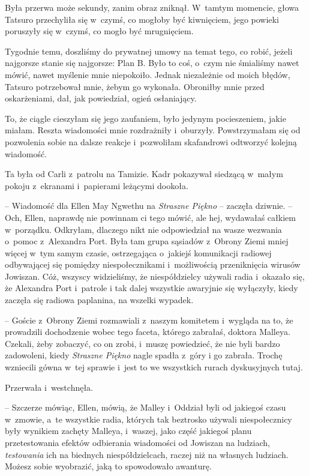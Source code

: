 \documentclass[oneside,polish,11pt,sfheadings]{mwbk}
\begin{document}
Była przerwa może sekundy, zanim obraz zniknął. W~tamtym momencie, głowa
Tatsuro przechyliła się w~czymś, co mogłoby być kiwnięciem, jego powieki
poruszyły się w~czymś, co mogło być mrugnięciem.

Tygodnie temu, doszliśmy do prywatnej umowy na temat tego, co robić,
jeżeli najgorsze stanie się najgorsze: Plan B. Było to coś, o~czym nie
śmialiśmy nawet mówić, nawet myślenie mnie niepokoiło. Jednak
niezależnie od moich błędów, Tatsuro potrzebował mnie, żebym go
wykonała. Obroniłby mnie przed oskarżeniami, dał, jak powiedział, ogień
osłaniający.

To, że ciągle cieszyłam się jego zaufaniem, było jedynym pocieszeniem,
jakie miałam. Reszta wiadomości mnie rozdrażniły i~oburzyły.
Powstrzymałam się od pozwolenia sobie na dalsze reakcje i~pozwoliłam
skafandrowi odtworzyć kolejną wiadomość.

Ta była od Carli z~patrolu na Tamizie. Kadr pokazywał siedzącą w~małym
pokoju z~ekranami i~papierami leżącymi dookoła.

-- Wiadomość dla Ellen May Ngwethu na \textit{Straszne Piękno} -- zaczęła
dziwnie. -- Och, Ellen, naprawdę nie powinnam ci tego mówić, ale hej,
wydawałaś całkiem w~porządku. Odkryłam, dlaczego nikt nie odpowiedział
na wasze wezwania o~pomoc z~Alexandra Port. Była tam grupa sąsiadów z~Obrony Ziemi mniej więcej w~tym samym czasie, ostrzegająca o~jakiejś
komunikacji radiowej odbywającej się pomiędzy niespołecznikami i~możliwością przeniknięcia wirusów Jowiszan. Cóż, wszyscy widzieliśmy, że
niespółdzielcy używali radia i~okazało się, że Alexandra Port i~patrole
i tak dalej wszystkie awaryjnie się wyłączyły, kiedy zaczęła się radiowa
paplanina, na wszelki wypadek.

-- Goście z~Obrony Ziemi rozmawiali z~naszym komitetem i~wygląda na to,
że prowadzili dochodzenie wobec tego faceta, którego zabrałaś, doktora
Malleya. Czekali, żeby zobaczyć, co on zrobi, i~muszę powiedzieć, że nie
byli bardzo zadowoleni, kiedy \textit{Straszne Piękno} nagle spadła z~góry
i go zabrała. Trochę wzniecili gówna w~tej sprawie i~jest to we
wszystkich rurach dyskusyjnych tutaj.

Przerwała i~westchnęła. 

-- Szczerze mówiąc, Ellen, mówią, że Malley i~Oddział byli od jakiegoś czasu w~zmowie, a~te wszystkie radia, których
tak beztrosko używali niespołecznicy były wynikiem zachęty Malleya, i~waszej, jako część jakiegoś planu przetestowania efektów odbierania
wiadomości od Jowiszan na ludziach, \textit{testowania} ich na biednych
niespółdzielcach, raczej niż na własnych ludziach. Możesz sobie
wyobrazić, jaką to spowodowało awanturę.
\end{document}
